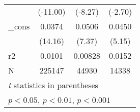 \begin{table}[htbp]
\begin{tabular}{l*{3}{c}}
            &    (-11.00)         &     (-8.27)         &     (-2.70)         \\
[1em]
\_cons      &      0.0374\sym{***}&      0.0506\sym{***}&      0.0450\sym{***}\\
            &     (14.16)         &      (7.37)         &      (5.15)         \\
\hline
r2          &      0.0101         &     0.00828         &      0.0152         \\
N           &      225147         &       44930         &       14338         \\
\hline\hline
\multicolumn{4}{l}{\footnotesize \textit{t} statistics in parentheses}\\
\multicolumn{4}{l}{\footnotesize \sym{*} \(p<0.05\), \sym{**} \(p<0.01\), \sym{***} \(p<0.001\)}\\
\end{tabular}
\end{table}
